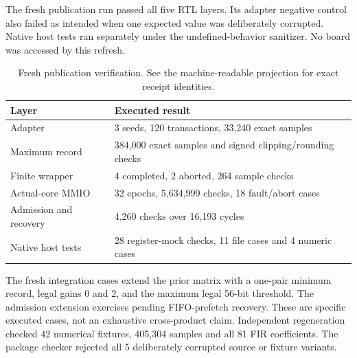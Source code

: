 The fresh publication run passed all five RTL layers. Its adapter negative control also failed as intended when one expected value was deliberately corrupted. Native host tests ran separately under the undefined-behavior sanitizer. No board was accessed by this refresh.

\begin{table}[H]\centering\small
\caption{Fresh publication verification. See the machine-readable projection for exact receipt identities.}
\begin{tabularx}{\linewidth}{@{}p{1.65in}Y@{}}\toprule
Layer & Executed result \\ \midrule
Adapter & 3 seeds, 120 transactions, 33,240 exact samples \\
Maximum record & 384,000 exact samples and signed clipping/rounding checks \\
Finite wrapper & 4 completed, 2 aborted, 264 sample checks \\
Actual-core MMIO & 32 epochs, 5,634,999 checks, 18 fault/abort cases \\
Admission and recovery & 4,260 checks over 16,193 cycles \\
Native host tests & 28 register-mock checks, 11 file cases and 4 numeric cases \\
\bottomrule\end{tabularx}
\end{table}

The fresh integration cases extend the prior matrix with a one-pair minimum record, legal gains 0 and 2, and the maximum legal 56-bit threshold. The admission extension exercises pending FIFO-prefetch recovery. These are specific executed cases, not an exhaustive cross-product claim.
Independent regeneration checked 42 numerical fixtures, 405,304 samples and all 81 FIR coefficients. The package checker rejected all 5 deliberately corrupted source or fixture variants.
